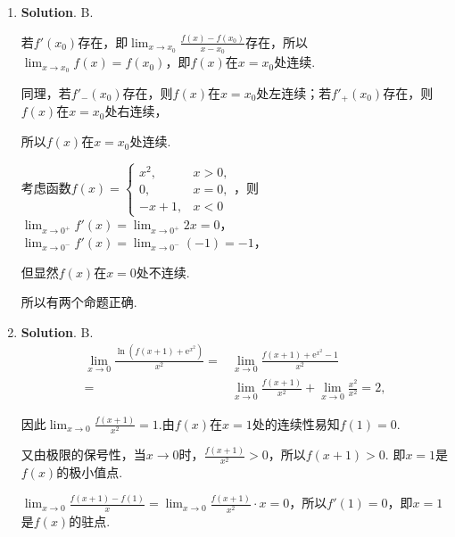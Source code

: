 \documentclass[../Main.tex]{subfiles}
\begin{document}
\begin{enumerate}
          通解$(C_{1}+C_{2} x)\mathrm{e}^{x}$对应齐次方程的二重特征根$r=1$，所以齐次方程为$y
              ''-2y'+y=0$.

          将特解$y^{*}=x$代入非齐次方程验证可得D选项$y''-2y'+y=x-2$满足题意.

    \item \textbf{Solution}. B.

          若$f'(x_{0})$存在，即$\lim_{x\to x_0}\frac{f(x)-f(x_{0})}{x-x_{0}}$存在，所以$\lim
              _{x\to x_0}f(x)=f(x_{0})$，即$f(x)$在$x=x_{0}$处连续.

          同理，若$f'_{-}(x_{0})$存在，则$f(x)$在$x=x_{0}$处左连续；若$f'_{+}(x_{0})$存在，则$f
              (x)$在$x=x_{0}$处右连续，

          所以$f(x)$在$x=x_{0}$处连续.

          考虑函数$f(x)=
              \begin{cases}
                  x^{2}, & x>0, \\
                  0,     & x=0, \\
                  -x+1,  & x<0
              \end{cases}$，则$\lim_{x\to0^+}f'(x)=\lim_{x\to0^+}2x=0$，$\lim_{x\to0^-}f'
              (x)=\lim_{x\to0^-}(-1)= -1$，

          但显然$f(x)$在$x=0$处不连续.

          所以有两个命题正确.

    \item \textbf{Solution}. B.
          \[
              \begin{aligned}
                  \lim_{x\to0}\frac{\ln\left(f(x+1)+\mathrm{e}^{x^2}\right)}{x^2}= & \lim_{x\to0}\frac{f(x+1)+\mathrm{e}^{x^2}-1}{x^2}              \\
                  =                                                                & \lim_{x\to0}\frac{f(x+1)}{x^2}+\lim_{x\to0}\frac{x^2}{x^2}= 2,
              \end{aligned}
          \]

          因此$\lim_{x\to0}\frac{f(x+1)}{x^{2}}=1$.由$f(x)$在$x=1$处的连续性易知$f(1)
              =0$.

          又由极限的保号性，当$x\to0$时，$\frac{f(x+1)}{x^{2}}>0$，所以$f(x+1)>0$. 即$x
              =1$是$f(x)$的极小值点.

          $\lim_{x\to 0}\frac{f(x+1)-f(1)}{x}=\lim_{x\to0}\frac{f(x+1)}{x^{2}}\cdot x
              =0$，所以$f'(1)=0$，即$x=1$是$f(x)$的驻点.


\end{enumerate}
\end{document}
